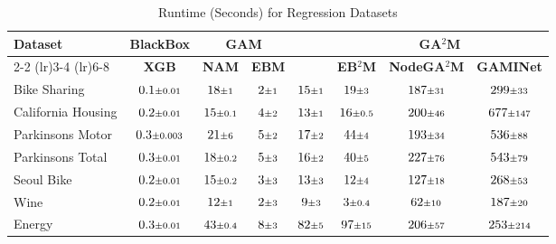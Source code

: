 \begin{table}[t]
\caption{Runtime (Seconds) for Regression Datasets}
\label{tab:regr-time-def}
\centering
\small 
\begin{tabular}{lccccccc}
\toprule
\textbf{Dataset} & \multicolumn{1}{c}{\textbf{BlackBox}} & \multicolumn{2}{c}{\textbf{GAM}} & \multicolumn{1}{c}{\textbf{\method{}}} & \multicolumn{3}{c}{\textbf{GA$^2$M}} \\
\cmidrule(lr){2-2} \cmidrule(lr){3-4}  \cmidrule(lr){6-8}
& \textbf{XGB} & \textbf{NAM} & \textbf{EBM} &   & \textbf{EB$^2$M} & \textbf{NodeGA$^2$M} & \textbf{GAMINet} \\
\midrule
Bike Sharing & $0.1 \text{\scriptsize$\pm$0.01}$ & $18 \text{\scriptsize$\pm$1}$ & $2 \text{\scriptsize$\pm$1}$ & $15 \text{\scriptsize$\pm$1}$ & $19 \text{\scriptsize$\pm$3}$ & $187 \text{\scriptsize$\pm$31}$ & $299 \text{\scriptsize$\pm$33}$ \\
California Housing & $0.2 \text{\scriptsize$\pm$0.01}$ & $15 \text{\scriptsize$\pm$0.1}$ & $4 \text{\scriptsize$\pm$2}$ & $13 \text{\scriptsize$\pm$1}$ & $16 \text{\scriptsize$\pm$0.5}$ & $200 \text{\scriptsize$\pm$46}$ & $677 \text{\scriptsize$\pm$147}$ \\
Parkinsons Motor & $0.3 \text{\scriptsize$\pm$0.003}$ & $21 \text{\scriptsize$\pm$6}$ & $5 \text{\scriptsize$\pm$2}$ & $17 \text{\scriptsize$\pm$2}$ & $44 \text{\scriptsize$\pm$4}$ & $193 \text{\scriptsize$\pm$34}$ & $536 \text{\scriptsize$\pm$88}$ \\
Parkinsons Total & $0.3 \text{\scriptsize$\pm$0.01}$ & $18 \text{\scriptsize$\pm$0.2}$ & $5 \text{\scriptsize$\pm$3}$ & $16 \text{\scriptsize$\pm$2}$ & $40 \text{\scriptsize$\pm$5}$ & $227 \text{\scriptsize$\pm$76}$ & $543 \text{\scriptsize$\pm$79}$ \\
Seoul Bike & $0.2 \text{\scriptsize$\pm$0.01}$ & $15 \text{\scriptsize$\pm$0.2}$ & $3 \text{\scriptsize$\pm$3}$ & $13 \text{\scriptsize$\pm$3}$ & $12 \text{\scriptsize$\pm$4}$ & $127 \text{\scriptsize$\pm$18}$ & $268 \text{\scriptsize$\pm$53}$ \\
Wine & $0.2 \text{\scriptsize$\pm$0.01}$ & $12 \text{\scriptsize$\pm$1}$ & $2 \text{\scriptsize$\pm$3}$ & $9 \text{\scriptsize$\pm$3}$ & $3 \text{\scriptsize$\pm$0.4}$ & $62 \text{\scriptsize$\pm$10}$ & $187 \text{\scriptsize$\pm$20}$ \\
Energy & $0.3 \text{\scriptsize$\pm$0.01}$ & $43 \text{\scriptsize$\pm$0.4}$ & $8 \text{\scriptsize$\pm$3}$ & $82 \text{\scriptsize$\pm$5}$ & $97 \text{\scriptsize$\pm$15}$ & $206 \text{\scriptsize$\pm$57}$ & $253 \text{\scriptsize$\pm$214}$ \\

\end{tabular}
\end{table}
